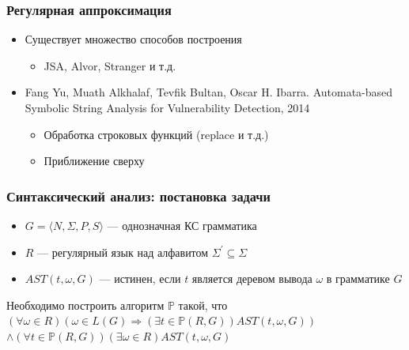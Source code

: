 \documentclass{beamer}
\begin{document}
\begin{frame}
    \transwipe[direction=90]
    \frametitle{Регулярная аппроксимация}
    \begin{itemize}
        \item Существует множество способов построения
        \begin{itemize}
          \item JSA, Alvor, Stranger и т.д.
        \end{itemize}
        \item Fang Yu, Muath Alkhalaf, Tevfik Bultan, Oscar H. Ibarra. Automata-based Symbolic String Analysis for Vulnerability Detection, 2014
        \begin{itemize}
          \item Обработка строковых функций (replace и т.д.)
          \item Приближение сверху
        \end{itemize}
    \end{itemize}
\end{frame}

\begin{frame}
    \transwipe[direction=90]
    \frametitle{Синтаксический анализ: постановка задачи}
    \begin{itemize}    
        \item $G=\langle N,\Sigma, P,S\rangle$ --- однозначная КС грамматика
        \item $R$ --- регулярный язык над алфавитом ${\Sigma}^{'} \subseteq \Sigma $
        \item $AST(t,\omega,G)$ --- истинен, если $t$ является деревом вывода $\omega$ в грамматике $G$
    \end{itemize}
    \begin{block}{}
    Необходимо построить алгоритм $\mathbb{P}$ такой, что
    $(\forall \omega \in R) (\omega \in L(G) \Rightarrow (\exists t \in \mathbb{P}(R,G))AST(t, \omega, G))$
    $\land (\forall t \in \mathbb{P}(R,G))(\exists \omega \in R)AST(t,\omega,G)$
    \end{block}
\end{frame}
\end{document}
